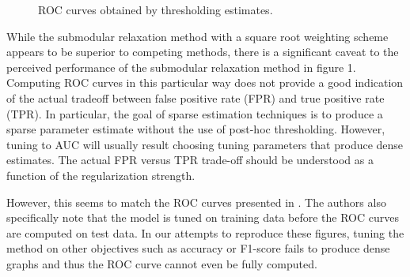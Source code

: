 \documentclass{uwstat572}
\theoremstyle{remark}
\theoremstyle{definition}
\begin{document}
\begin{figure}
\caption{ROC curves obtained by thresholding estimates.}
\label{fig:threshold}
\end{figure}

While the submodular relaxation method with a square root weighting scheme appears to be superior to competing methods, there is a significant caveat to the perceived performance of the submodular relaxation method in figure 1.  Computing ROC curves in this particular way does not provide a good indication of the actual tradeoff between false positive rate (FPR) and true positive rate (TPR).  In particular, the goal of sparse estimation techniques is to produce a sparse parameter estimate without the use of post-hoc thresholding.  However, tuning to AUC will usually result choosing tuning parameters that produce dense estimates.  The actual FPR versus TPR trade-off should be understood as a function of the regularization strength.

However, this seems to match the ROC curves presented in \cite{Defazio2012}.  The authors also specifically note that the model is tuned on training data before the ROC curves are computed on test data.  In our attempts to reproduce these figures, tuning the method on other objectives such as accuracy or F1-score fails to produce dense graphs and thus the ROC curve cannot even be fully computed.  
\end{document}
